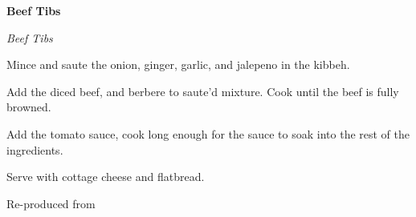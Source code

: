 \documentclass[../recipe-collections/cooking.tex]{subfiles}
\begin{document}
\begin{recipe}{\textbf{Beef Tibs}}{}{}

  \freeform{}\textit{Beef Tibs}


  Mince and saute the onion, ginger, garlic, and jalepeno in the kibbeh. 


  Add the diced beef, and berbere to saute'd mixture. Cook until the beef is fully browned.


  Add the tomato sauce, cook long enough for the sauce to soak into the rest of the ingredients.


  Serve with cottage cheese and flatbread.

  \freeform{}\hrulefill{}

\end{recipe}

Re-produced from  \autocite{youtube_tasty_2019}
\end{document}
